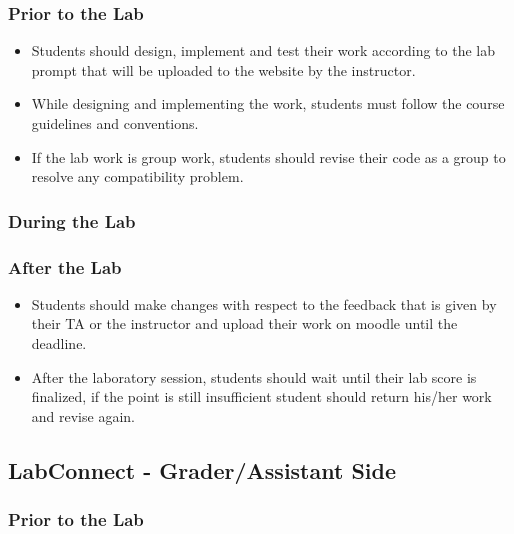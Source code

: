 \documentclass[a4paper, 12pt]{article}
\begin{document}
    \subsubsection{Prior to the Lab}
    
    \begin{itemize}
      \item Students should design, implement and test their work according to the lab prompt that 
      will be uploaded to the website by the instructor.
      \item While designing and implementing the work, students must follow the course guidelines and conventions.
      \item If the lab work is group work, students should revise their code as a group to resolve any
      compatibility problem.
    \end{itemize}
    
    \subsubsection{During the Lab}
    
    
    \subsubsection{After the Lab}
    
    \begin{itemize}
      \item Students should make changes with respect to the feedback that is given by their TA or the instructor
      and upload their work on moodle until the deadline. %
      \item After the laboratory session, students should wait until their lab score is finalized, if the point is 
      still insufficient student should return his/her work and revise again.
    \end{itemize}
    
    \subsection{LabConnect - Grader/Assistant Side}
    
    \subsubsection{Prior to the Lab}
    
\end{document}
